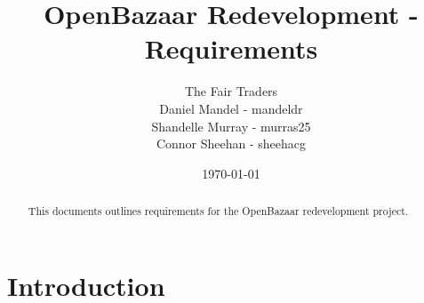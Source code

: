 \documentclass{article}
\begin{document}
\title{OpenBazaar Redevelopment - Requirements}
\author{The Fair Traders \\ Daniel Mandel - mandeldr \\ Shandelle Murray - murras25 \\ Connor Sheehan - sheehacg}
\date{\today}
\maketitle

\begin{abstract}
This documents outlines requirements for the OpenBazaar redevelopment project.
\end{abstract}

\section{Introduction}
\end{document}
